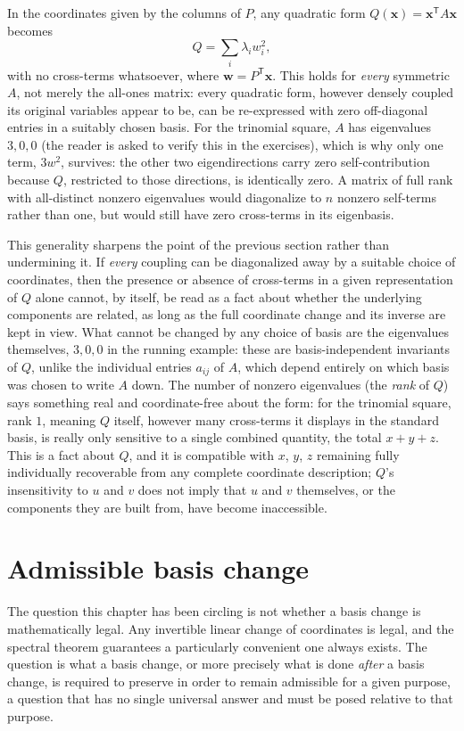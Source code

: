 \documentclass[11pt]{book}
\begin{document}
In the coordinates given by the columns of $P$, any quadratic form $Q(\mathbf{x})=\mathbf{x}^{\mathsf T}A\mathbf{x}$ becomes
\[
Q = \sum_i \lambda_i w_i^2,
\]
with no cross-terms whatsoever, where $\mathbf{w}=P^{\mathsf T}\mathbf{x}$. This holds for \emph{every} symmetric $A$, not merely the all-ones matrix: every quadratic form, however densely coupled its original variables appear to be, can be re-expressed with zero off-diagonal entries in a suitably chosen basis. For the trinomial square, $A$ has eigenvalues $3,0,0$ (the reader is asked to verify this in the exercises), which is why only one term, $3w^2$, survives: the other two eigendirections carry zero self-contribution because $Q$, restricted to those directions, is identically zero. A matrix of full rank with all-distinct nonzero eigenvalues would diagonalize to $n$ nonzero self-terms rather than one, but would still have zero cross-terms in its eigenbasis.

This generality sharpens the point of the previous section rather than undermining it. If \emph{every} coupling can be diagonalized away by a suitable choice of coordinates, then the presence or absence of cross-terms in a given representation of $Q$ alone cannot, by itself, be read as a fact about whether the underlying components are related, as long as the full coordinate change and its inverse are kept in view. What cannot be changed by any choice of basis are the eigenvalues themselves, $3,0,0$ in the running example: these are basis-independent invariants of $Q$, unlike the individual entries $a_{ij}$ of $A$, which depend entirely on which basis was chosen to write $A$ down. The number of nonzero eigenvalues (the \emph{rank} of $Q$) says something real and coordinate-free about the form: for the trinomial square, rank $1$, meaning $Q$ itself, however many cross-terms it displays in the standard basis, is really only sensitive to a single combined quantity, the total $x+y+z$. This is a fact about $Q$, and it is compatible with $x$, $y$, $z$ remaining fully individually recoverable from any complete coordinate description; $Q$'s insensitivity to $u$ and $v$ does not imply that $u$ and $v$ themselves, or the components they are built from, have become inaccessible.

\section{Admissible basis change}

The question this chapter has been circling is not whether a basis change is mathematically legal. Any invertible linear change of coordinates is legal, and the spectral theorem guarantees a particularly convenient one always exists. The question is what a basis change, or more precisely what is done \emph{after} a basis change, is required to preserve in order to remain admissible for a given purpose, a question that has no single universal answer and must be posed relative to that purpose.
\end{document}
